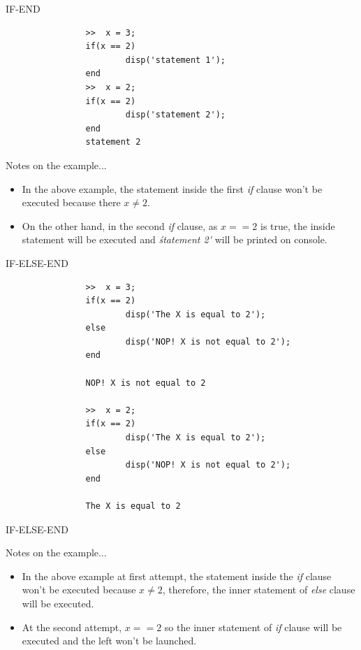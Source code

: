 \documentclass{beamer}
\begin{document}
\begin{frame}[fragile]{IF-END}
	\begin{block}{}
				\java
				\begin{lstlisting}
				>>	x = 3;
				if(x == 2)
						disp('statement 1');
				end				
				>>	x = 2;
				if(x == 2)
						disp('statement 2');
				end
				statement 2
				\end{lstlisting}
	\end{block}

	\begin{block}{Notes on the example...}
		\begin{itemize}
			\item In the above example, the statement inside the first \textit{if} clause won't be executed because there $x \neq 2$. 
			\item On the other hand, in the second \textit{if} clause, as $x == 2$ is true, the inside statement will be executed and \textit{\'statement 2\'} will be printed on console.
		\end{itemize}
	\end{block}

\end{frame}

\begin{frame}[fragile]{IF-ELSE-END}
	\begin{block}{}
				\java
				\begin{lstlisting}
				>>	x = 3;
				if(x == 2)
						disp('The X is equal to 2');
				else
						disp('NOP! X is not equal to 2');
				end
				
				NOP! X is not equal to 2

				>>	x = 2;
				if(x == 2)
						disp('The X is equal to 2');
				else
						disp('NOP! X is not equal to 2');
				end
				
				The X is equal to 2
				\end{lstlisting}
	\end{block}

\end{frame}

\begin{frame}{IF-ELSE-END}
	\begin{block}{Notes on the example...}
		\begin{itemize}
			\item In the above example at first attempt, the statement inside the \textit{if} clause won't be executed because $x \neq 2$, therefore, the inner statement of \textit{else} clause will be executed.
			\item At the second attempt, $x == 2$ so the inner statement of \textit{if} clause will be executed and the left won't be launched.
		\end{itemize}
	\end{block}
\end{frame}	
	
\end{document}
